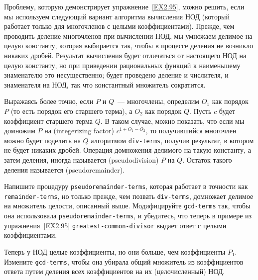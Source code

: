 \medskip

Проблему, которую демонстрирует 
упражнение~\ref{EX2.95}, можно решить, если мы используем
следующий
вариант алгоритма вычисления НОД (который работает только для
многочленов с целыми коэффициентами).  Прежде, чем проводить деление
многочленов при вычислении НОД, мы умножаем делимое на целую константу,
которая выбирается так, чтобы в процессе деления не возникло никаких
дробей.  Результат вычисления будет отличаться от настоящего НОД на
целую константу, но при приведении рациональных функций к наименьшему
знаменателю это несущественно; будет проведено деление и числителя, и
знаменателя на НОД, так что константный множитель сократится.

Выражаясь более точно, если $P$
и $Q$~---  многочлены, определим 
$O_1$ как порядок $P$ (то
есть порядок его старшего терма), а $O_2$ как
порядок $Q$.  Пусть $c$
будет коэффициент старшего терма $Q$. В таком
случае, можно показать, что если мы домножим $P$
на  (integerizing factor)
$c^{1+O_1-O_2}$, то получившийся многочлен можно
будет поделить на $Q$ алгоритмом
{\tt div-terms}, получив результат, в котором не будет никаких дробей.
Операция домножения делимого на такую константу, а затем деления,
иногда называется  (pseudodivision)
$P$ на $Q$.  Остаток
такого деления называется  (pseudoremainder).

\begin{exercise}[]{2.96}\label{EX2.96}%
\samepage
\nopagebreak
\begin{plainenum}
\item Напишите процедуру
{\tt pseudoremainder-terms}, которая работает в точности как
{\tt remainder-terms}, но только прежде, чем позвать
{\tt div-terms}, домножает делимое на множитель целости,
описанный выше.  Модифицируйте {\tt gcd-terms} так, чтобы она
использовала {\tt pseudoremainder-terms}, и убедитесь, что
теперь в примере из упражнения~\ref{EX2.95}
{\tt greatest-common-divisor} выдает ответ с целыми
коэффициентами.

\item Теперь у НОД целые коэффициенты, но они
больше, чем коэффициенты $P_1$.  Измените
{\tt gcd-terms}, чтобы она убирала общий множитель из
коэффициентов ответа путем деления всех коэффициентов на их (целочисленный)
НОД.
\end{plainenum}
\end{exercise}

